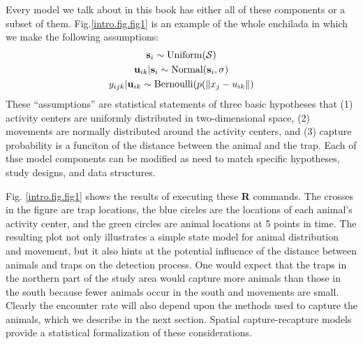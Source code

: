 Every model we talk about in this book has either all of these
components or a subset of them. Fig.\ref{intro.fig.fig1} is an example of the whole
enchilada in which we make the following assumptions:
\begin{gather}
{\bf s}_{i} \sim \mbox{Uniform}({\cal S}) \\
{\bf u}_{ik} | {\bf s}_{i} \sim \mbox{Normal}({\bf s}_{i}, \sigma) \\
y_{ijk} | {\bf u}_{ik} \sim \mbox{Bernoulli}(p(\| x_j - u_{ik} \|)
\end{gather}
These ``assumptions'' are statistical statements of three basic hypotheses
that (1) activity centers are uniformly distributed in two-dimensional
space, (2) movements are normally distributed around the activity
centers, and (3) capture probability is a funciton of the distance
between the animal and the trap. Each of thse model components can be
modified as need to match specific hypotheses, study designs, and data
structures.

Fig. \ref{intro.fig.fig1} shows the results of executing these {\bf R} commands. The crosses
in the figure are trap locations, the blue circles are the locations
of each animal's activity center, and the green circles are animal
locations at 5 points in time.  The resulting plot not only
illustrates a simple state model for animal distribution and movement,
but it also hints at the potential influence of the distance between
animals and traps on the detection process. One would expect that the
traps in the northern part of the study area would capture more
animals than those in the south because fewer animals occur in the
south and movements are small. Clearly the encounter rate will also
depend upon the methods used to capture the animals, which we describe
in the next section.  Spatial capture-recapture models provide a
statistical formalization of these considerations.


